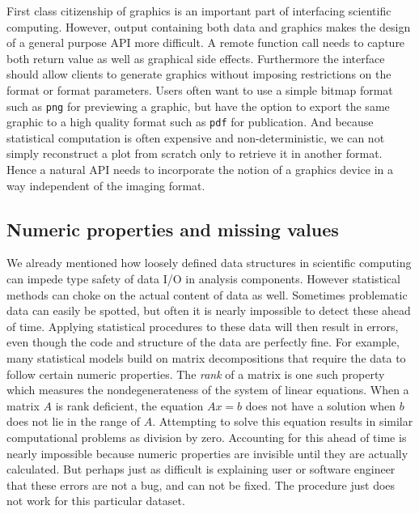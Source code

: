\documentclass{article}
\begin{document}
First class citizenship of graphics is an important part of interfacing scientific computing. However, output containing both data and graphics makes the design of a general purpose API more difficult. A remote function call needs to capture both return value as well as graphical side effects. Furthermore the interface should allow clients to generate graphics without imposing restrictions on the format or format parameters. Users often want to use a simple bitmap format such as \texttt{png} for previewing a graphic, but have the option to export the same graphic to a high quality format such as \texttt{pdf} for publication. And because statistical computation is often expensive and non-deterministic, we can not simply reconstruct a plot from scratch only to retrieve it in another format. Hence a natural API needs to incorporate the notion of a graphics device in a way independent of the imaging format. 

\subsection{Numeric properties and missing values}

We already mentioned how loosely defined data structures in scientific computing can impede type safety of data I/O in analysis components. However statistical methods can choke on the actual content of data as well. Sometimes problematic data can easily be spotted, but often it is nearly impossible to detect these ahead of time. Applying statistical procedures to these data will then result in errors, even though the code and structure of the data are perfectly fine. For example, many statistical models build on matrix decompositions that require the data to follow certain numeric properties. The \emph{rank} of a matrix is one such property which measures the nondegenerateness of the system of linear equations. When a matrix $A$ is rank deficient, the equation $Ax=b$ does not have a solution when $b$ does not lie in the range of $A$. Attempting to solve this equation results in similar computational problems as division by zero. Accounting for this ahead of time is nearly impossible because numeric properties are invisible until they are actually calculated. But perhaps just as difficult is explaining user or software engineer that these errors are not a bug, and can not be fixed. The procedure just does not work for this particular dataset.
\end{document}
